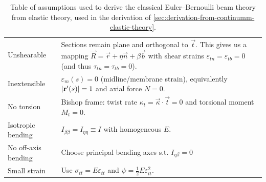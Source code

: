 \begin{table}[b]
	\centering
	\begin{tabularx}{\textwidth}{>{\raggedright\arraybackslash}p{}>{\raggedright\arraybackslash}X}
		Unshearable         & Sections remain plane and orthogonal to \(\vec t\). This gives us a mapping \(\vec R = \vec r + \eta \vec n + \beta \vec b\) with shear strains \(\varepsilon_{tn}= \varepsilon_{tb}=0\) (and thus \(\tau_{t n}=\tau_{t b} = 0\)). \\
		Inextensible        & \(\varepsilon_m(s)=0\) (midline/membrane strain), equivalently \(\left| \mathbf{r}'(s) \right|=1\) and axial force \(N=0\).                                                                                                                     \\
		No torsion          & Bishop frame: twist rate \(\kappa_t = \vec \kappa \cdot \vec t=0\) and torsional moment \(M_t=0\).                                                                                                                                 \\
		Isotropic bending   & \(I_{\beta\beta}=I_{\eta\eta}\equiv I\) with homogeneous \(E\).                                                                                                                                                                    \\
		No off-axis bending & Choose principal bending axes s.t. \(I_{\eta\beta}=0\)                                                                                                                                                                             \\
		Small strain        & Use \(\sigma_{tt} = E \varepsilon_{tt}\) and \(\psi = \frac12 E \varepsilon_{tt}^2\).                                                                                                                                              \\
	\end{tabularx}
	\caption{Table of assumptions used to derive the classical Euler--Bernoulli beam theory from elastic theory, used in the derivation of \ref{sec:derivation-from-continumm-elastic-theory}.}
	\label{tab:assumptions-euler-bernoulli-beam}
\end{table}

